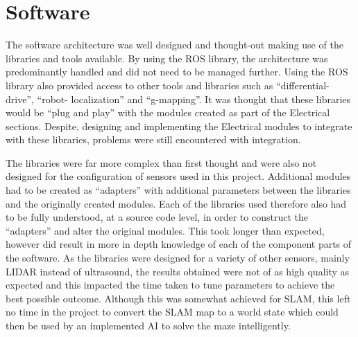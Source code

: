 \section{Software}\label{eval/soft}
The software architecture was well designed and thought-out making use of the 
libraries and tools available. By using the ROS library, the architecture was predominantly handled
and did not need to be managed further. Using the ROS library also provided 
access to other tools and libraries such as ``differential-drive'', ``robot-
localization'' and ``g-mapping''. It was thought that these libraries would be ``plug 
and play'' with the modules created as part of the Electrical sections. Despite, 
designing and implementing the Electrical modules to integrate with these libraries, 
problems were still encountered with integration. 

The libraries were far more complex than first thought and were also not designed for 
the configuration of sensors used in this project. Additional modules had to be 
created as ``adapters'' with additional parameters between the libraries and the 
originally created modules. Each of the libraries used therefore also had to be fully 
understood, at a source code level, in order to construct the ``adapters'' and alter 
the original modules. This took longer than expected, however did result in more in 
depth knowledge of each of the component parts of the software. As the libraries were 
designed for a variety of other sensors, mainly LIDAR instead of ultrasound, the 
results obtained were not of as high quality as expected and this impacted the time 
taken to tune parameters to achieve the best possible outcome. Although this was 
somewhat achieved for SLAM, this left no time in the project to convert the SLAM map 
to a world state which could then be used by an implemented AI to solve the maze 
intelligently. 


